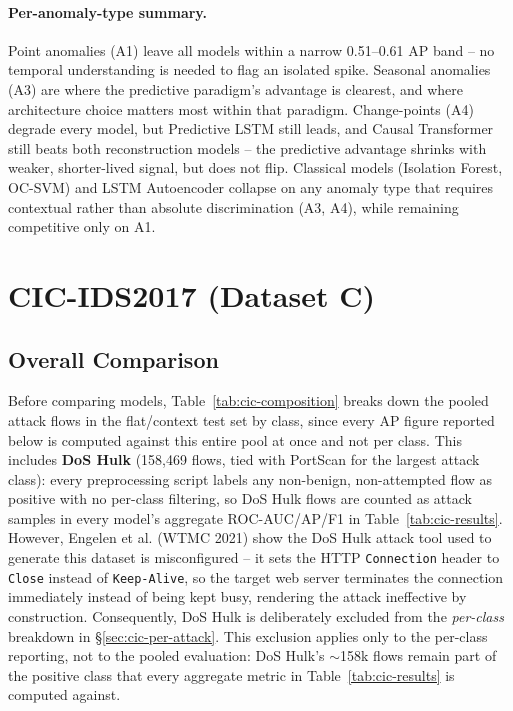 \paragraph{Per-anomaly-type summary.} Point anomalies (A1) leave all models within a narrow 0.51--0.61 AP band -- no temporal understanding is needed to flag an isolated spike. Seasonal anomalies (A3) are where the predictive paradigm's advantage is clearest, and where architecture choice matters most within that paradigm. Change-points (A4) degrade every model, but Predictive LSTM still leads, and Causal Transformer still beats both reconstruction models -- the predictive advantage shrinks with weaker, shorter-lived signal, but does not flip. Classical models (Isolation Forest, OC-SVM) and LSTM Autoencoder collapse on any anomaly type that requires contextual rather than absolute discrimination (A3, A4), while remaining competitive only on A1.

\section{CIC-IDS2017 (Dataset C)}

\subsection{Overall Comparison}

Before comparing models, Table~\ref{tab:cic-composition} breaks down the pooled attack flows in the flat/context test set by class, since every AP figure reported below is computed against this entire pool at once and not per class. This includes \textbf{DoS Hulk} (158{,}469 flows, tied with PortScan for the largest attack class): every preprocessing script labels any non-benign, non-attempted flow as positive with no per-class filtering, so DoS Hulk flows are counted as attack samples in every model's aggregate ROC-AUC/AP/F1 in Table~\ref{tab:cic-results}. However, Engelen et al. (WTMC 2021) show the DoS Hulk attack tool used to generate this dataset is misconfigured -- it sets the HTTP \texttt{Connection} header to \texttt{Close} instead of \texttt{Keep-Alive}, so the target web server terminates the connection immediately instead of being kept busy, rendering the attack ineffective by construction. Consequently, DoS Hulk is deliberately excluded from the \emph{per-class} breakdown in \S\ref{sec:cic-per-attack}. This exclusion applies only to the per-class reporting, not to the pooled evaluation: DoS Hulk's $\sim$158k flows remain part of the positive class that every aggregate metric in Table~\ref{tab:cic-results} is computed against.

